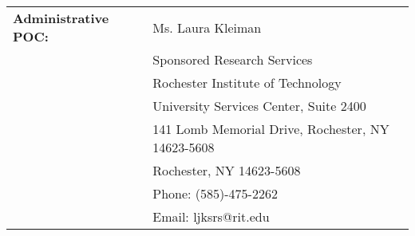 \documentclass[12pt]{article}
\begin{document}
\begin{titlepage}
\begin{tabular}{ L{50mm} L{100mm} }
\vspace{-6mm}\normalsize \textbf{Administrative POC:} & \vspace{-6mm} \normalsize Ms. Laura Kleiman \\

   & \vspace{-10mm} \normalsize Sponsored Research Services  \\
   & \vspace{-12mm} \normalsize Rochester Institute of Technology  \\
   & \vspace{-14mm} \normalsize University Services Center, Suite 2400  \\
   & \vspace{-16mm} \normalsize 141 Lomb Memorial Drive, Rochester, NY 14623-5608   \\
   & \vspace{-18mm} \normalsize Rochester, NY 14623-5608  \\
   & \vspace{-20mm} \normalsize Phone: (585)-475-2262  \\
   & \vspace{-22mm} \normalsize Email: ljksrs@rit.edu  \\




\end{tabular}

 \end{titlepage}

\cfoot{\thepage}
\setcounter{tocdepth}{1} %

\cfoot{} %




\setcounter{page}{1}

\end{document}
